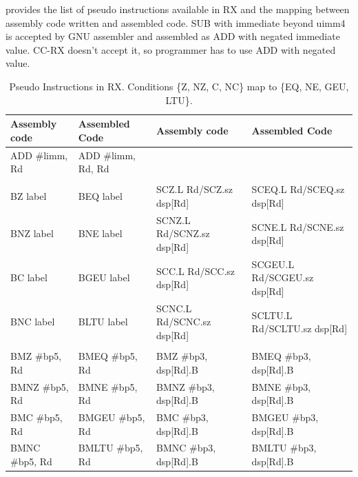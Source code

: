\SOPNoteBody

 provides the list of pseudo instructions available in RX and the
mapping between assembly code written and assembled code. SUB with immediate beyond uimm4 is accepted by GNU 
assembler and assembled as ADD with negated immediate value. CC-RX doesn't accept it, so programmer has to 
use ADD with negated value.

\begin{table}
\scriptsize
\begin{center}
\begin{tabular}{ll|ll}
\hline
Assembly code         & Assembled Code         & Assembly code               & Assembled Code                  \\ \hline
ADD \#limm, Rd        & ADD \#limm, Rd, Rd     &                             &                                 \\
                      &                        &                             &                                 \\
BZ label              & BEQ label              & SCZ.L Rd/SCZ.sz dsp[Rd]     & SCEQ.L Rd/SCEQ.sz dsp[Rd]       \\
BNZ label             & BNE label              & SCNZ.L Rd/SCNZ.sz dsp[Rd]   & SCNE.L Rd/SCNE.sz dsp[Rd]       \\
BC label              & BGEU label             & SCC.L Rd/SCC.sz dsp[Rd]     & SCGEU.L Rd/SCGEU.sz dsp[Rd]     \\
BNC label             & BLTU label             & SCNC.L Rd/SCNC.sz dsp[Rd]   & SCLTU.L Rd/SCLTU.sz dsp[Rd]     \\
                      &                        &                             &                                 \\
BMZ \#bp5, Rd         & BMEQ \#bp5, Rd         & BMZ \#bp3, dsp[Rd].B        & BMEQ \#bp3, dsp[Rd].B           \\
BMNZ \#bp5, Rd        & BMNE \#bp5, Rd         & BMNZ \#bp3, dsp[Rd].B       & BMNE \#bp3, dsp[Rd].B           \\
BMC \#bp5, Rd         & BMGEU \#bp5, Rd        & BMC \#bp3, dsp[Rd].B        & BMGEU \#bp3, dsp[Rd].B          \\
BMNC \#bp5, Rd        & BMLTU \#bp5, Rd        & BMNC \#bp3, dsp[Rd].B       & BMLTU \#bp3, dsp[Rd].B          \\ \hline
\end{tabular}
\end{center}
\captionsetup{font=scriptsize, labelfont=scriptsize}
\caption{Pseudo Instructions in RX. Conditions \{Z, NZ, C, NC\} map to \{EQ, NE, GEU, LTU\}.}
\end{table}


